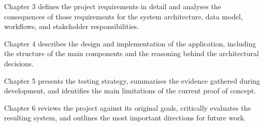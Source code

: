 Chapter 3 defines the project requirements in detail and analyses the consequences of those requirements for the system architecture, data model, workflows, and stakeholder responsibilities.

Chapter 4 describes the design and implementation of the application, including the structure of the main components and the reasoning behind the architectural decisions.

Chapter 5 presents the testing strategy, summarises the evidence gathered during development, and identifies the main limitations of the current proof of concept.

Chapter 6 reviews the project against its original goals, critically evaluates the resulting system, and outlines the most important directions for future work.